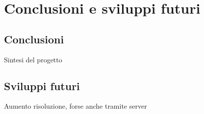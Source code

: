 \chapter{Conclusioni e sviluppi futuri}

\section{Conclusioni}

Sintesi del progetto

\section{Sviluppi futuri}
\label{sec:sviluppi-futuri}

Aumento risoluzione, forse anche tramite server